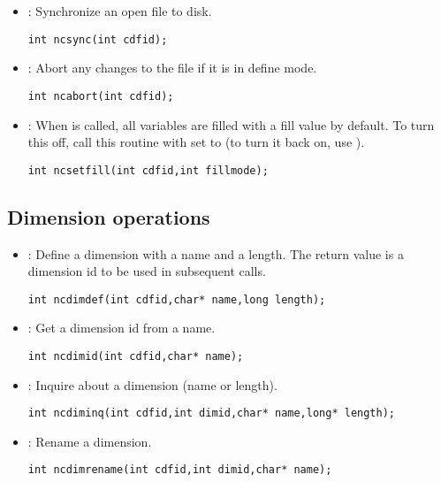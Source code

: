 \documentclass{article}
\begin{document}
\begin{itemize}
\item {} : Synchronize an open file to disk. 
\begin{verbatim}
int ncsync(int cdfid);
\end{verbatim}

\item {} : Abort any changes to the file if it is in define mode. 
\begin{verbatim}
int ncabort(int cdfid);
\end{verbatim}

\item {} : When  is called, all variables are
filled with a fill value by default. To turn this off, call this
routine with  set to  (to turn it back
on, use ).
\begin{verbatim}
int ncsetfill(int cdfid,int fillmode);
\end{verbatim}

\end{itemize}

\subsection{Dimension operations}

\begin{itemize}

\item {} : Define a dimension with a name and a length. The
return value is a 
dimension id to be used in subsequent calls.
\begin{verbatim}
int ncdimdef(int cdfid,char* name,long length);
\end{verbatim}

\item {} : Get a dimension id from a name. 
\begin{verbatim}
int ncdimid(int cdfid,char* name);
\end{verbatim}

\item {} : Inquire about a dimension (name or length). 
\begin{verbatim}
int ncdiminq(int cdfid,int dimid,char* name,long* length);
\end{verbatim}

\item {} : Rename a dimension. 
\begin{verbatim}
int ncdimrename(int cdfid,int dimid,char* name);
\end{verbatim}

\end{itemize}
\end{document}
